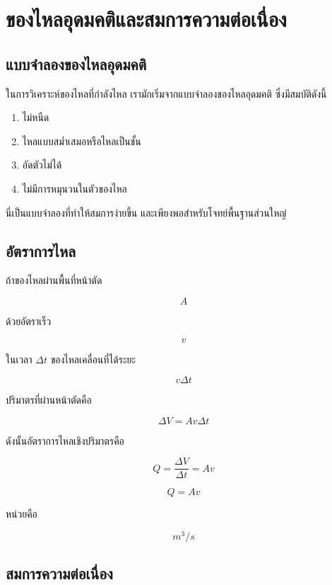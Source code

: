 \section{ของไหลอุดมคติและสมการความต่อเนื่อง}

\subsection{แบบจำลองของไหลอุดมคติ}

ในการวิเคราะห์ของไหลที่กำลังไหล เรามักเริ่มจากแบบจำลองของไหลอุดมคติ ซึ่งมีสมบัติดังนี้

\begin{enumerate}
    \item ไม่หนืด
    \item ไหลแบบสม่ำเสมอหรือไหลเป็นชั้น
    \item อัดตัวไม่ได้
    \item ไม่มีการหมุนวนในตัวของไหล
\end{enumerate}

นี่เป็นแบบจำลองที่ทำให้สมการง่ายขึ้น และเพียงพอสำหรับโจทย์พื้นฐานส่วนใหญ่

\subsection{อัตราการไหล}

ถ้าของไหลผ่านพื้นที่หน้าตัด

\[
A
\]

ด้วยอัตราเร็ว

\[
v
\]

ในเวลา $\Delta t$ ของไหลเคลื่อนที่ได้ระยะ

\[
v\Delta t
\]

ปริมาตรที่ผ่านหน้าตัดคือ

\[
\Delta V=Av\Delta t
\]

ดังนั้นอัตราการไหลเชิงปริมาตรคือ

\[
Q=\frac{\Delta V}{\Delta t}=Av
\]

\begin{tcolorbox}[title=อัตราการไหลเชิงปริมาตร]
\[
Q=Av
\]

หน่วยคือ

\[
\si{m^3/s}
\]
\end{tcolorbox}

\subsection{สมการความต่อเนื่อง}

